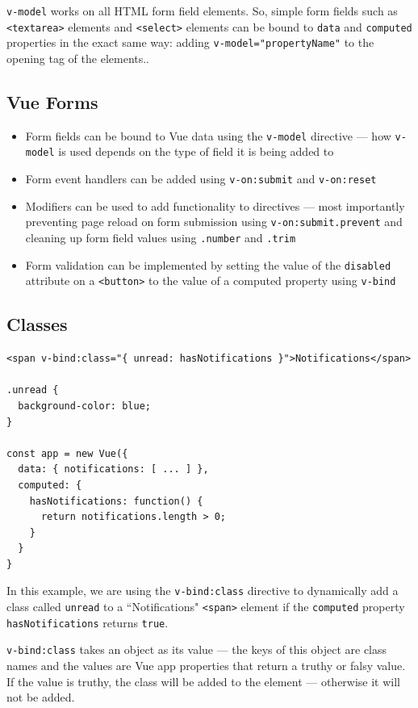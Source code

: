 \documentclass[a4paper, 12pt]{article}
\begin{document}
\verb|v-model| works on all HTML form field elements. So, simple form fields such as \verb|<textarea>| elements and \verb|<select>| elements can be bound to \verb|data| and \verb|computed| properties in the exact same way: adding \verb|v-model="propertyName"| to the opening tag of the elements..

\subsection{Vue Forms}
\begin{itemize}
\item Form fields can be bound to Vue data using the \verb|v-model| directive — how \verb|v-model| is used depends on the type of field it is being added to

\item Form event handlers can be added using \verb|v-on:submit| and \verb|v-on:reset|

\item Modifiers can be used to add functionality to directives — most importantly preventing page reload on form submission using \verb|v-on:submit.prevent| and cleaning up form field values using \verb|.number| and \verb|.trim|

\item Form validation can be implemented by setting the value of the \verb|disabled| attribute on a \verb|<button>| to the value of a computed property using \verb|v-bind|
\end{itemize}

\subsection{Classes}
\begin{verbatim}
<span v-bind:class="{ unread: hasNotifications }">Notifications</span>

.unread {
  background-color: blue;
}

const app = new Vue({
  data: { notifications: [ ... ] },
  computed: {
    hasNotifications: function() {
      return notifications.length > 0;
    }
  }
}
\end{verbatim}
In this example, we are using the \verb|v-bind:class| directive to dynamically add a class called \verb|unread| to a ``Notifications" \verb|<span>| element if the \verb|computed| property \verb|hasNotifications| returns \verb|true|.

\verb|v-bind:class| takes an object as its value — the keys of this object are class names and the values are Vue app properties that return a truthy or falsy value. If the value is truthy, the class will be added to the element — otherwise it will not be added.
\end{document}
